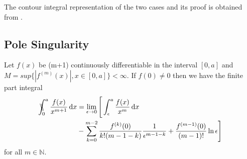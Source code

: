 The contour integral representation of the two cases and its proof is obtained from \cite{galapon2017problem}.

\subsection{Pole Singularity}

\begin{proposition}
Let $f(x)$ be (m+1) continuously differentiable in the interval $[0,a]$ and $M=sup\{ |f^{(m)}(x)|, x \in [0,a]\} < \infty$. If $f(0) \neq 0$ then we have the finite part integral
\begin{align}
\begin{split}
 \bbint{0}{a} \frac{f(x)}{x^{m+1}} \, \mathrm{d}x & = \lim_{\epsilon \to 0} \Bigg[ \int_\epsilon^a \frac{f(x)}{x^m} \, \mathrm{d}x \\& - \sum_{k=0}^{m-2} \frac{f^{(k)}(0)}{k! (m-1-k)}\frac{1}{\epsilon^{m-1-k}} + \frac{f^{(m-1)}(0)}{(m-1)!} \ln \epsilon \Bigg]
    \label{3.7}
\end{split}
\end{align}
for all $m \in \mathbb{N}$.
\end{proposition}


